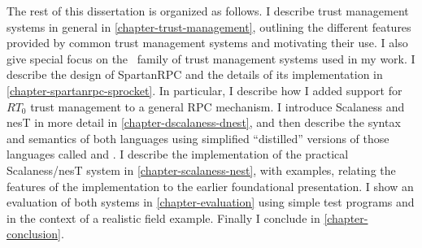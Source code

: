 The rest of this dissertation is organized as follows. I describe trust management systems in
general in \autoref{chapter-trust-management}, outlining the different features provided by
common trust management systems and motivating their use. I also give special focus on the \RT\
family of trust management systems used in my work. I describe the design of SpartanRPC and the
details of its implementation in \autoref{chapter-spartanrpc-sprocket}. In particular, I
describe how I added support for $RT_0$ trust management to a general RPC mechanism. I introduce
Scalaness and nesT in more detail in \autoref{chapter-dscalaness-dnest}, and then describe the
syntax and semantics of both languages using simplified ``distilled'' versions of those
languages called \newterm{DScalaness} and \newterm{DnesT}. I describe the implementation of the
practical Scalaness/nesT system in \autoref{chapter-scalaness-nest}, with examples, relating the
features of the implementation to the earlier foundational presentation. I show an evaluation of
both systems in \autoref{chapter-evaluation} using simple test programs and in the context of a
realistic field example. Finally I conclude in \autoref{chapter-conclusion}.


